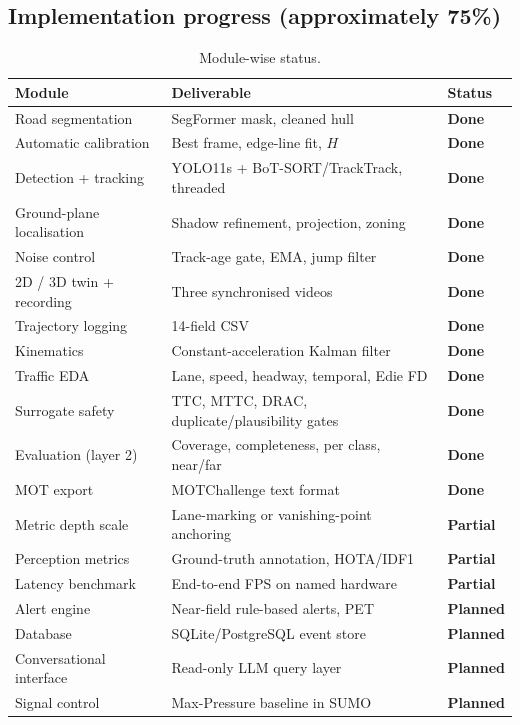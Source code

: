 \documentclass[11pt,a4paper]{article}
\newcommand{\stDone}{\textcolor{done}{\textbf{Done}}}
\newcommand{\stPart}{\textcolor{partial}{\textbf{Partial}}}
\newcommand{\stTodo}{\textcolor{todo}{\textbf{Planned}}}
\begin{document}
\subsection{Implementation progress (approximately 75\%)}
\begin{table}[H]
\centering\small
\caption{Module-wise status.}
\label{tab:progress}
\begin{tabularx}{\textwidth}{@{}l Y l@{}}
\toprule
\textbf{Module} & \textbf{Deliverable} & \textbf{Status}\\
\midrule
Road segmentation & SegFormer mask, cleaned hull & \stDone\\
Automatic calibration & Best frame, edge-line fit, $H$ & \stDone\\
Detection + tracking & YOLO11s + BoT-SORT/TrackTrack, threaded & \stDone\\
Ground-plane localisation & Shadow refinement, projection, zoning & \stDone\\
Noise control & Track-age gate, EMA, jump filter & \stDone\\
2D / 3D twin + recording & Three synchronised videos & \stDone\\
Trajectory logging & 14-field CSV & \stDone\\
Kinematics & Constant-acceleration Kalman filter & \stDone\\
Traffic EDA & Lane, speed, headway, temporal, Edie FD & \stDone\\
Surrogate safety & TTC, MTTC, DRAC, duplicate/plausibility gates & \stDone\\
Evaluation (layer 2) & Coverage, completeness, per class, near/far & \stDone\\
MOT export & MOTChallenge text format & \stDone\\
Metric depth scale & Lane-marking or vanishing-point anchoring & \stPart\\
Perception metrics & Ground-truth annotation, HOTA/IDF1 & \stPart\\
Latency benchmark & End-to-end FPS on named hardware & \stPart\\
Alert engine & Near-field rule-based alerts, PET & \stTodo\\
Database & SQLite/PostgreSQL event store & \stTodo\\
Conversational interface & Read-only LLM query layer & \stTodo\\
Signal control & Max-Pressure baseline in SUMO & \stTodo\\
\bottomrule
\end{tabularx}
\end{table}
\end{document}
